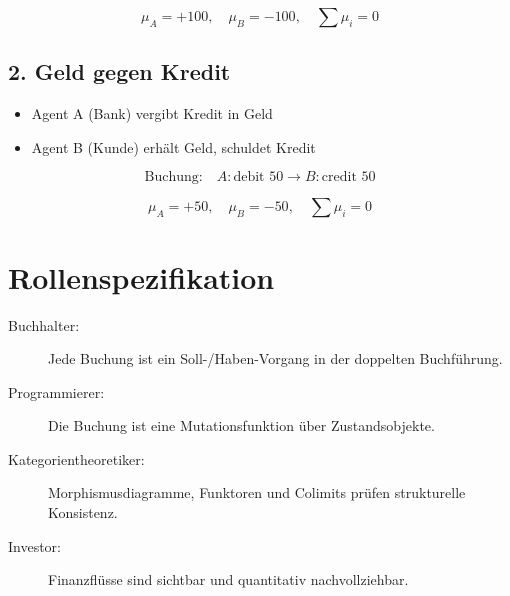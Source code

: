 \documentclass{article}
\begin{document}
\begin{center}
\end{center}

\[
\mu_A = +100, \quad \mu_B = -100, \quad \sum \mu_i = 0
\]

\subsection*{2. Geld gegen Kredit}

\begin{itemize}
  \item Agent A (Bank) vergibt Kredit in Geld
  \item Agent B (Kunde) erhält Geld, schuldet Kredit
\end{itemize}

\[
\text{Buchung:} \quad A: \text{debit } 50 \longrightarrow B: \text{credit } 50
\]

\begin{center}
\end{center}

\[
\mu_A = +50, \quad \mu_B = -50, \quad \sum \mu_i = 0
\]

\section*{Rollenspezifikation}

\begin{description}
  \item[Buchhalter:] Jede Buchung ist ein Soll-/Haben-Vorgang in der doppelten Buchführung.
  \item[Programmierer:] Die Buchung ist eine Mutationsfunktion über Zustandsobjekte.
  \item[Kategorientheoretiker:] Morphismusdiagramme, Funktoren und Colimits prüfen strukturelle Konsistenz.
  \item[Investor:] Finanzflüsse sind sichtbar und quantitativ nachvollziehbar.
\end{description}
\end{document}
